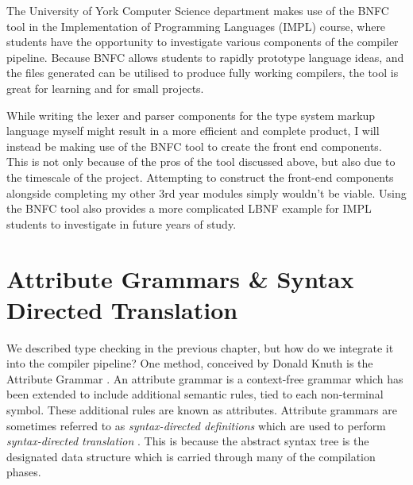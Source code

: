\documentclass{UoYCSproject}
\begin{document}
The University of York Computer Science department makes use of the BNFC tool
in the Implementation of Programming Languages (IMPL) course, where students
have the opportunity to investigate various components of the compiler pipeline.
Because BNFC allows students to rapidly prototype language ideas, and the files
generated can be utilised to produce fully working compilers, the tool is great
for learning and for small projects.

While writing the lexer and parser components for the type system markup language
myself might result in a more efficient and complete product, I will instead be
making use of the BNFC tool to create the front end components. This is not only
because of the pros of the tool discussed above, but also due to the timescale
of the project. Attempting to construct the front-end components alongside
completing my other 3rd year modules simply wouldn't be viable. Using the BNFC
tool also provides a more complicated LBNF example for IMPL students to
investigate in future years of study.

\section{Attribute Grammars \& Syntax Directed Translation}
We described type checking in the previous chapter, but how do we
integrate it into the compiler pipeline? One method, conceived by Donald Knuth
is the Attribute Grammar \cite{KnuthGrammars}. An attribute grammar is a
context-free grammar which has been extended to include additional semantic
rules, tied to each non-terminal symbol. These additional rules are known as
attributes. Attribute grammars are sometimes referred to as 
\textit{syntax-directed definitions} which are used to perform 
\textit{syntax-directed translation} \cite{DragonBook}. This is because the 
abstract syntax tree is the designated data structure which is carried
through many of the compilation phases.
\end{document}
